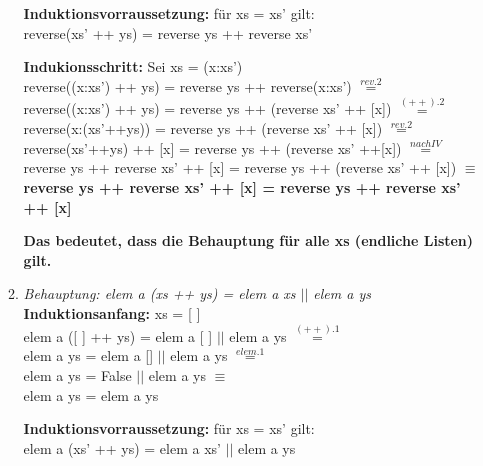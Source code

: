 \documentclass[11pt]{article}
\begin{document}
\begin{enumerate}
\begin{enumerate}
\vspace*{0.5cm}
\textbf{Induktionsvorraussetzung:} für xs = xs' gilt:\\
reverse(xs' ++ ys) = reverse ys ++ reverse xs'

\vspace*{0.5cm}
\textbf{Indukionsschritt:} Sei xs = (x:xs')\\
reverse((x:xs') ++ ys) = reverse ys ++ reverse(x:xs') $\stackrel{rev.2}{=}$\\
reverse((x:xs') ++ ys) = reverse ys ++ (reverse xs' ++ [x]) $\stackrel{(++).2}{=}$\\
reverse(x:(xs'++ys)) = reverse ys ++ (reverse xs' ++ [x]) $\stackrel{rev.2}{=}$\\
reverse(xs'++ys) ++ [x] = reverse ys ++ (reverse xs' ++[x]) $\stackrel{nach IV}{=}$\\
reverse ys ++ reverse xs' ++ [x] = reverse ys ++ (reverse xs' ++ [x]) $\equiv$\\
\textbf{reverse ys ++ reverse xs' ++ [x] = reverse ys ++ reverse xs' ++ [x]}

\vspace*{0.5cm}
\textbf{Das bedeutet, dass die Behauptung für alle xs (endliche Listen) gilt.}

\vspace*{0.5cm}
\item
\textit{Behauptung: elem a (xs ++ ys) = elem a xs $||$ elem a ys}
\vspace*{0.5cm}
\newline
\textbf{Induktionsanfang:} xs = [ ]\\
elem a ([ ] ++ ys) = elem a [ ] $||$ elem a ys $\stackrel{(++).1}{=}$\\
elem a ys = elem a [] $||$ elem a ys $\stackrel{elem.1}{=}$\\
elem a ys = False $||$ elem a ys $\equiv$\\
elem a ys = elem a ys

\vspace*{0.5cm}
\textbf{Induktionsvorraussetzung:} für xs = xs' gilt:\\
elem a (xs' ++ ys) = elem a xs' $||$ elem a ys


\end{enumerate}
\end{enumerate}
\end{document}
